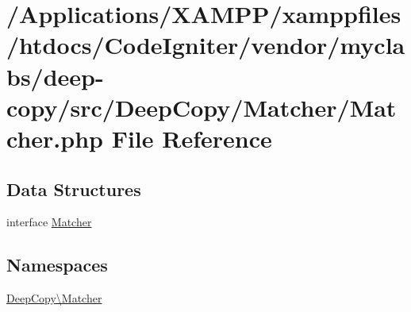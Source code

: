 \hypertarget{myclabs_2deep-copy_2src_2_deep_copy_2_matcher_2_matcher_8php}{}\section{/\+Applications/\+X\+A\+M\+P\+P/xamppfiles/htdocs/\+Code\+Igniter/vendor/myclabs/deep-\/copy/src/\+Deep\+Copy/\+Matcher/\+Matcher.php File Reference}
\label{myclabs_2deep-copy_2src_2_deep_copy_2_matcher_2_matcher_8php}
\subsection*{Data Structures}
\begin{DoxyCompactItemize}
\item 
interface \mbox{\hyperlink{interface_deep_copy_1_1_matcher_1_1_matcher}{Matcher}}
\end{DoxyCompactItemize}
\subsection*{Namespaces}
\begin{DoxyCompactItemize}
\item 
 \mbox{\hyperlink{namespace_deep_copy_1_1_matcher}{Deep\+Copy\textbackslash{}\+Matcher}}
\end{DoxyCompactItemize}
